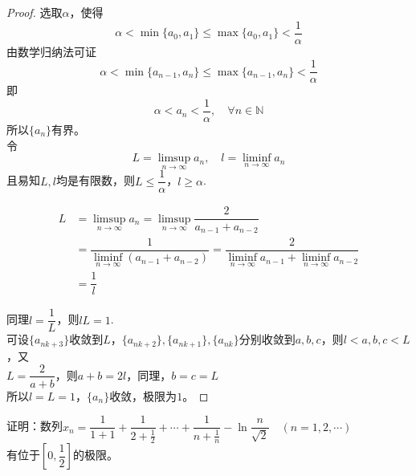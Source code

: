 \begin{proof}

    选取$\alpha$，使得
    $$\alpha < \min\{a_0,a_1\} \leq \max\{a_0,a_1\} < \dfrac{1}{\alpha}$$
    由数学归纳法可证
    $$\alpha < \min\{a_{n - 1},a_n\} \leq \max\{a_{n - 1},a_n\} < \dfrac{1}{\alpha}$$
    即
    $$\alpha < a_n < \dfrac{1}{\alpha}, \quad \forall n \in \mathbb{N}$$
    所以$\{a_n\}$有界。\\
    令
    $$L = \limsup_{n \to \infty}{a_n},\quad l = \liminf_{n \to \infty}{a_n}$$
    且易知$L,l$均是有限数，则$L \leq \dfrac{1}{\alpha}$，$l \geq \alpha$.

    \begin{align*}
        L & = \limsup_{n \to \infty}{a_n} = \limsup_{n \to \infty}{\dfrac{2}{a_{n - 1} + a_{n - 2}}} \\
         & = \dfrac{1}{\liminf\limits_{n \to \infty}{(a_{n - 1} + a_{n - 2})}} = \dfrac{2}{\liminf\limits_{n \to \infty}{a_{n - 1}} + \liminf\limits_{n \to \infty}{a_{n - 2}}} \\ 
         & = \dfrac{1}{l}
    \end{align*}

    同理$l = \dfrac{1}{L}$，则$lL = 1$. \\
    可设$\{a_{nk+3}\}$收敛到$L$，$\{a_{nk+2}\},\{a_{nk + 1}\},\{a_{nk}\}$分别收敛到$a,b,c$，则$l < a,b,c < L$，又\\
    $L = \dfrac{2}{a+b} $，则$a+b = 2l $，同理，$b =c =L$\\
    所以$l = L = 1$，$\{a_n\}$收敛，极限为$1$。

\end{proof}

\begin{proposition}

    证明：数列$x_n = \dfrac{1}{1+1} + \dfrac{1}{2 + \frac{1}{2}} + \cdots + \dfrac{1}{n + \frac{1}{n}} - \ln{\dfrac{n}{\sqrt{2}}} \quad (n = 1, 2, \cdots)$\\
    有位于$\left[0,\dfrac{1}{2}\right]$的极限。
    
\end{proposition}


